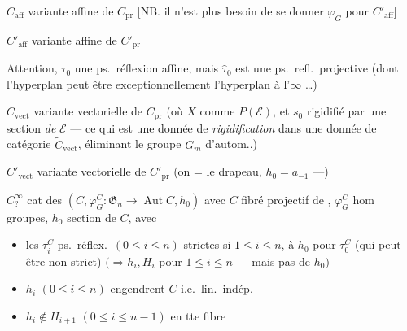 \documentclass[11pt,a4paper]{article}
\begin{document}
 $C_{\mathrm{aff}}$ variante affine de $C_{\mathrm{pr}}$
[NB. il n'est plus besoin de se donner $\varphi_G$ \ill{} pour
$C'_{\mathrm{aff}}$]

 $C'_{\mathrm{aff}}$ variante affine de
$C'_{\mathrm{pr}}$

Attention, $\tau_0$  une ps.\ réflexion affine,
mais $\widehat{\tau}_0$ est une ps.\ refl.\ projective (dont l'hyperplan peut
être exceptionnellement l'hyperplan à l'$\infty$ \ldots)

 $C_{\mathrm{vect}}$ variante vectorielle de
$C_{\mathrm{pr}}$ (où $X$  comme $P(\mathcal{E})$, et $s_0$
rigidifié par une section \emph{de} $\mathcal{E}$ — ce qui
 est une donnée de \emph{rigidification} dans une donnée de
catégorie $\widetilde{C}_{\mathrm{vect}}$, éliminant le groupe $G_m$
d'autom..)

$C'_{\mathrm{vect}}$  variante vectorielle de
$C'_{\mathrm{pr}}$ (on  \ill{} = le drapeau,
 $h_0 = a_{-1}$ ---)

\struck{\ill{}} $C^{\infty}_{?}$ cat des
$(C, \varphi^{C}_{G} : \mathfrak{G}_n \to \operatorname{Aut} C, h_0)$ avec $C$
fibré projectif de , $\varphi^{C}_{G}$ hom groupes, $h_0$
section de $C$, avec
\begin{itemize}
\item[a)] les $\tau^{C}_{i}$ ps.\ réflex.\ $(0 \leq i \leq n)$ strictes si
$1 \leq i \leq n$,  à $h_0$ pour $\tau^{C}_{0}$ (qui peut
être non strict) $(\Rightarrow h_i, H_i$ pour $1 \leq i \leq n$ — mais pas de
$h_0)$
\end{itemize}

\begin{itemize}
\item[b)] $h_i$ $(0 \leq i \leq n)$ engendrent $C$ i.e.\ lin.\ indép.
\item[c)] $h_i \notin H_{i+1}$ $(0 \leq i \leq n-1)$ en tte fibre
\end{itemize}
\end{document}
